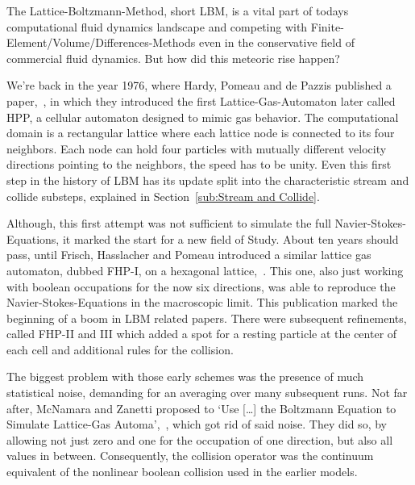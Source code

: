 
The Lattice-Boltzmann-Method, short LBM, is a vital part of todays computational fluid dynamics landscape and competing with Finite-Element/Volume/Differences-Methods even in the conservative field of commercial fluid dynamics. But how did this meteoric rise happen?

We're back in the year 1976, where Hardy, Pomeau and de Pazzis published a paper,~\cite{hardy1976molecular}, in which they introduced the first Lattice-Gas-Automaton later called HPP, a cellular automaton designed to mimic gas behavior. The computational domain is a rectangular lattice where each lattice node is connected to its four neighbors. Each node can hold four particles with mutually different velocity directions pointing to the neighbors, the speed has to be unity. Even this first step in the history of LBM has its update split into the characteristic stream and collide substeps, explained in Section~\ref{sub:Stream and Collide}.

Although, this first attempt was not sufficient to simulate the full Navier-Stokes-Equations, it marked the start for a new field of Study.
About ten years should pass, until Frisch, Hasslacher and Pomeau introduced a similar lattice gas automaton, dubbed FHP-I, on a hexagonal lattice,~\cite{frisch1986lattice}. This one, also just working with boolean occupations for the now six directions, was able to reproduce the Navier-Stokes-Equations in the macroscopic limit. This publication marked the beginning of a boom in LBM related papers. There were subsequent refinements, called FHP-II and III which added a spot for a resting particle at the center of each cell and additional rules for the collision.

The biggest problem with those early schemes was the presence of much statistical noise, demanding for an averaging over many subsequent runs. Not far after, McNamara and Zanetti proposed to `Use [\ldots] the Boltzmann Equation to Simulate Lattice-Gas Automa',~\cite{PhysRevLett.61.2332}, which got rid of said noise. They did so, by allowing not just zero and one for the occupation of one direction, but also all values in between. Consequently, the collision operator was the continuum equivalent of the nonlinear boolean collision used in the earlier models.

